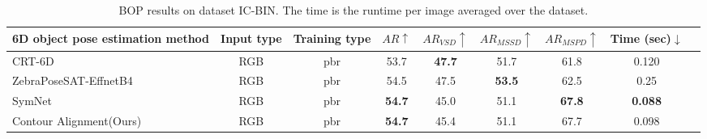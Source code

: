 \begin{sidewaystable}[ht]
        \centering
        \caption{
                BOP results on dataset IC-BIN\cite{icbin}. The time is the runtime per image averaged over the dataset.
        }
        \begin{tabular}{l c c c c c c c c}
        \toprule
        6D object pose estimation method &Input type&Training type&$AR\uparrow$&$AR_{VSD}\uparrow$&$AR_{MSSD}\uparrow$&$AR_{MSPD}\uparrow$&Time (sec)$\downarrow$\\
        \midrule
        CRT-6D~\cite{castro2023crt}&RGB&pbr&53.7&\textbf{47.7}&51.7&61.8&0.120 \\
        ZebraPoseSAT-EffnetB4&RGB&pbr&54.5&47.5&\textbf{53.5}&62.5&0.25 \\
        SymNet&RGB&pbr&\textbf{54.7}&45.0&51.1&\textbf{67.8}&\textbf{0.088} \\
        Contour Alignment(Ours)&RGB&pbr&\textbf{54.7}&45.4&51.1&67.7&0.098 \\
        \bottomrule
        \end{tabular}
\label{tab:icbin_bop}
\end{sidewaystable}
